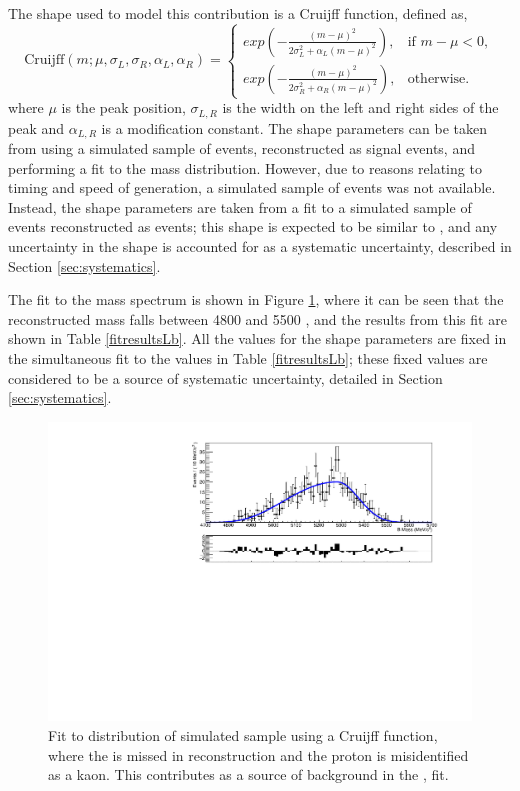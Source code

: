 The shape used to model this  contribution is a Cruijff function, defined as,
\begin{equation}
  \mathrm{Cruijff}(m; \mu,\sigma_L,\sigma_R,\alpha_L,\alpha_R)=
\begin{cases}
    exp \left( -\frac{(m-\mu)^2}{2\sigma_L^2 + \alpha_L(m-\mu)^2} \right) ,     & \text{if } m-\mu < 0, \\
    exp \left( -\frac{(m-\mu)^2}{2\sigma_R^2 + \alpha_R(m-\mu)^2} \right) ,     & \text{otherwise.}
\end{cases}
\label{Cruijff}
\end{equation}%
where $\mu$ is the peak position, $\sigma_{L,R}$ is the width on the left and right sides of the peak and $\alpha_{L,R}$ is a modification constant. The shape parameters can be taken from using a simulated sample of  events, reconstructed as \decay{\Bm}{\D\Kstarm} signal events, and performing a fit to the \Bm mass distribution. However, due to reasons relating to timing and speed of generation, a simulated sample of  events was not available. Instead, the shape parameters are taken from a fit to a simulated sample of \decay{\Lb}{\Lc\Km} events reconstructed as \decay{\Bm}{\D\Km} events; this shape is expected to be similar to , and any uncertainty in the shape is accounted for as a systematic uncertainty, described in Section \ref{sec:systematics}.

The fit to the \Bm mass spectrum is shown in Figure \ref{Lbfit}, where it can be seen that the reconstructed \Bm mass falls between 4800 and 5500 \mevcc, and the results from this fit are shown in Table \ref{fitresultsLb}. All the values for the shape parameters are fixed in the simultaneous fit to the values in Table \ref{fitresultsLb}; these fixed values are considered to be a source of systematic uncertainty, detailed in Section \ref{sec:systematics}. 

\begin{figure}[h]
\centering
\includegraphics[width=0.7\linewidth]{figures/backgrounds/Lb2LcKst.pdf}
\caption{Fit to distribution of simulated  sample using a Cruijff function, where the \pip is missed in reconstruction and the proton is misidentified as a kaon. This contributes as a source of background in the \decay{\Bm}{\D\Kstarm}, \decay{\D}{\Kp\Km} fit.}
\label{Lbfit}
\end{figure}

